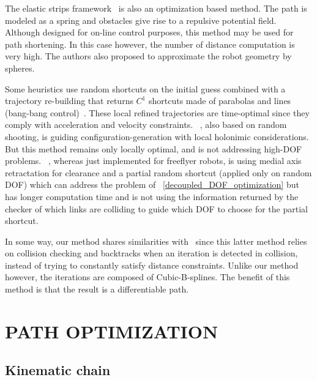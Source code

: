 \documentclass{tADR2e}
\begin{document}
The elastic strips framework~\cite{BrockElasticStrips} is also an optimization 
based method. The path is modeled as a spring and obstacles give rise to a 
repulsive potential field. Although designed for on-line control purposes, this 
method may be used for path shortening. In this case however, the number of 
distance computation is very high. The authors also proposed to approximate the 
robot geometry by spheres.

Some heuristics use random shortcuts on the initial guess combined with a 
trajectory re-building that returns ${C}^1$ shortcuts made of parabolas and lines 
(bang-bang control)~\cite{HauserFastSmooth}. These local refined trajectories 
are time-optimal since they comply with acceleration and velocity constraints. ~\cite{Guernane2011}, also based on random shooting, is guiding configuration-generation with local holonimic considerations. But this method remains only locally optimal, and is not addressing high-DOF problems.
~\cite{Geraerts04clearancebased}, whereas just implemented for freeflyer robots, is using medial axis retractation for clearance and a partial random shortcut (applied only on random DOF) which can address the problem of ~\ref{decoupled_DOF_optimization} but has longer computation time and is not using the information returned by the checker of which links are colliding to guide which DOF to choose for the partial shortcut.

In some way, our method shares similarities with~\cite{PanSmoothSplineShort} 
since this latter method relies on collision checking and backtracks when an 
iteration is detected in collision, instead of trying to constantly satisfy 
distance constraints. Unlike our method however, the iterations are composed of 
Cubic-B-splines. The benefit of this method is that the result is a 
differentiable path.



\section{PATH OPTIMIZATION} \label{section:path_optim}

\subsection {Kinematic chain}
\end{document}

